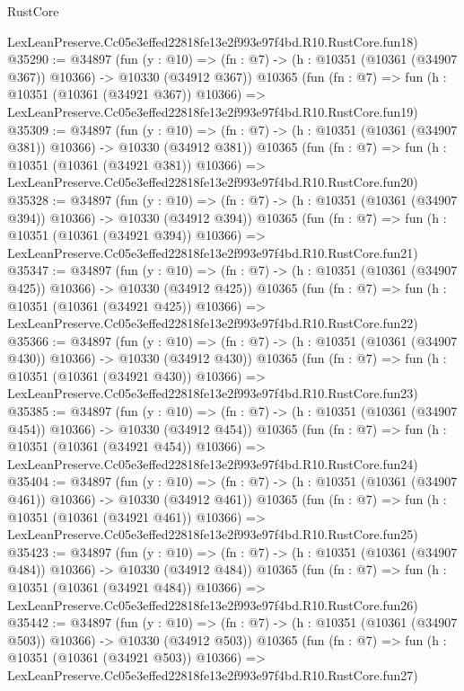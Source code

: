 \begin{lexlean}{RustCore}
\begin{coremodule}
    LexLeanPreserve.Cc05e3effed22818fe13e2f993e97f4bd.R10.RustCore.fun18)
@35290 := @34897
    (fun (y : @10) =>
    (fn : @7) -> (h : @10351 (@10361 (@34907 @367)) @10366) -> @10330 (@34912 @367))
    @10365
    (fun (fn : @7) =>
    fun (h : @10351 (@10361 (@34921 @367)) @10366) =>
    LexLeanPreserve.Cc05e3effed22818fe13e2f993e97f4bd.R10.RustCore.fun19)
@35309 := @34897
    (fun (y : @10) =>
    (fn : @7) -> (h : @10351 (@10361 (@34907 @381)) @10366) -> @10330 (@34912 @381))
    @10365
    (fun (fn : @7) =>
    fun (h : @10351 (@10361 (@34921 @381)) @10366) =>
    LexLeanPreserve.Cc05e3effed22818fe13e2f993e97f4bd.R10.RustCore.fun20)
@35328 := @34897
    (fun (y : @10) =>
    (fn : @7) -> (h : @10351 (@10361 (@34907 @394)) @10366) -> @10330 (@34912 @394))
    @10365
    (fun (fn : @7) =>
    fun (h : @10351 (@10361 (@34921 @394)) @10366) =>
    LexLeanPreserve.Cc05e3effed22818fe13e2f993e97f4bd.R10.RustCore.fun21)
@35347 := @34897
    (fun (y : @10) =>
    (fn : @7) -> (h : @10351 (@10361 (@34907 @425)) @10366) -> @10330 (@34912 @425))
    @10365
    (fun (fn : @7) =>
    fun (h : @10351 (@10361 (@34921 @425)) @10366) =>
    LexLeanPreserve.Cc05e3effed22818fe13e2f993e97f4bd.R10.RustCore.fun22)
@35366 := @34897
    (fun (y : @10) =>
    (fn : @7) -> (h : @10351 (@10361 (@34907 @430)) @10366) -> @10330 (@34912 @430))
    @10365
    (fun (fn : @7) =>
    fun (h : @10351 (@10361 (@34921 @430)) @10366) =>
    LexLeanPreserve.Cc05e3effed22818fe13e2f993e97f4bd.R10.RustCore.fun23)
@35385 := @34897
    (fun (y : @10) =>
    (fn : @7) -> (h : @10351 (@10361 (@34907 @454)) @10366) -> @10330 (@34912 @454))
    @10365
    (fun (fn : @7) =>
    fun (h : @10351 (@10361 (@34921 @454)) @10366) =>
    LexLeanPreserve.Cc05e3effed22818fe13e2f993e97f4bd.R10.RustCore.fun24)
@35404 := @34897
    (fun (y : @10) =>
    (fn : @7) -> (h : @10351 (@10361 (@34907 @461)) @10366) -> @10330 (@34912 @461))
    @10365
    (fun (fn : @7) =>
    fun (h : @10351 (@10361 (@34921 @461)) @10366) =>
    LexLeanPreserve.Cc05e3effed22818fe13e2f993e97f4bd.R10.RustCore.fun25)
@35423 := @34897
    (fun (y : @10) =>
    (fn : @7) -> (h : @10351 (@10361 (@34907 @484)) @10366) -> @10330 (@34912 @484))
    @10365
    (fun (fn : @7) =>
    fun (h : @10351 (@10361 (@34921 @484)) @10366) =>
    LexLeanPreserve.Cc05e3effed22818fe13e2f993e97f4bd.R10.RustCore.fun26)
@35442 := @34897
    (fun (y : @10) =>
    (fn : @7) -> (h : @10351 (@10361 (@34907 @503)) @10366) -> @10330 (@34912 @503))
    @10365
    (fun (fn : @7) =>
    fun (h : @10351 (@10361 (@34921 @503)) @10366) =>
    LexLeanPreserve.Cc05e3effed22818fe13e2f993e97f4bd.R10.RustCore.fun27)

\end{coremodule}
\end{lexlean}

